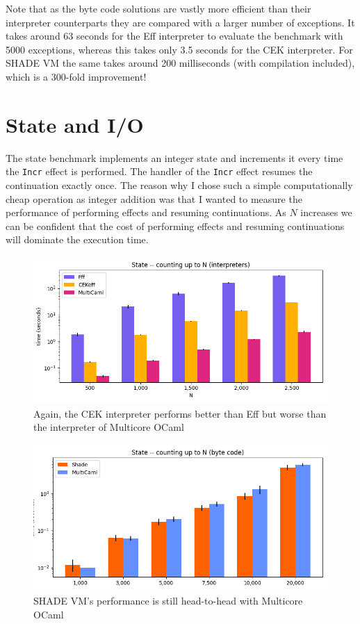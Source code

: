 \documentclass[class=article, crop=false]{standalone}
\begin{document}
Note that as the byte code solutions are vastly more efficient than their
interpreter counterparts they are compared with a larger number of exceptions.
It takes around 63 seconds for the Eff interpreter to evaluate the benchmark
with 5000 exceptions, whereas this takes only 3.5 seconds for the CEK
interpreter. For SHADE VM the same takes around 200 milliseconds
(with compilation included), which is a 300-fold improvement!

\section{State and I/O}

The state benchmark implements an integer state and increments it every time the
\verb|Incr| effect is performed. The handler of the \verb|Incr| effect resumes
the continuation exactly once. The reason why I chose such a simple
computationally cheap operation as integer addition was that I wanted to measure
the performance of performing effects and resuming continuations. As $N$
increases we can be confident that the cost of performing effects and resuming
continuations will dominate the execution time.

\begin{figure}
    \centering
    \includegraphics[width=35em]{eval_plots/interp_state.png}
    \caption{Again, the CEK interpreter performs better than Eff but worse than
    the interpreter of Multicore OCaml}
    \label{fig:state-interpreters}
\end{figure}

\begin{figure}
    \centering
    \includegraphics[width=35em]{eval_plots/comp_state.png}
    \caption{SHADE VM's performance is still head-to-head with Multicore OCaml}
    \label{fig:state-bytecode}
\end{figure}
\end{document}
